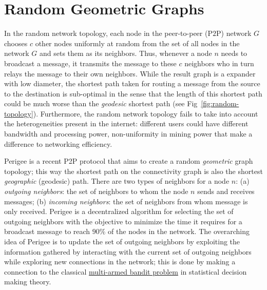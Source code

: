 \documentclass{article}
\begin{document}
\section*{Random Geometric Graphs}
In the random network topology, each node in the peer-to-peer (P$2$P) network $G$ chooses $c$ other nodes uniformly at random from the set of all nodes in the network $G$ and sets them as its neighbors. Thus, whenever a node $n$ needs to broadcast a message, it transmits the message to these $c$ neighbors who in turn relays the message to their own neighbors. While the result graph is a expander with low diameter, the shortest path taken for routing a message from the source to the destination is sub-optimal in the sense that the length of this shortest path could be much worse than the {\em geodesic} shortest path (see Fig~\ref{fig:random-topology}). Furthermore, the random network topology fails to take into account the heterogeneities present in the internet: different users could have different bandwidth and processing power, non-uniformity in mining power that make a difference to networking efficiency. 

{\sf Perigee} is a recent P2P protocol that aims to create a random {\em geometric} graph topology; this way the shortest path on the connectivity graph is also the shortest {\em geographic} (geodesic)  path. There are two types of neighbors for a node $n$: (a) \textit{outgoing neighbors}: the set of neighbors to whom the node $n$ sends and receives messages; (b) \textit{incoming neighbors}: the set of neighbors from whom message is only received. {\sf Perigee} is a decentralized algorithm  for selecting the set of outgoing neighbors with the objective to minimize the time it requires for a broadcast message to reach $90\%$ of the nodes in the network. The overarching idea of {\sf Perigee} is to update the set of outgoing neighbors by exploiting the information gathered by interacting with the current set of outgoing neighbors while exploring new connections in the network; this is done by making a connection to the classical \href{https://epubs.siam.org/doi/abs/10.1137/S0097539701398375}{multi-armed  bandit problem} in statistical decision making theory.
\end{document}
